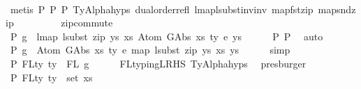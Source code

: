 \begin{isabellebody}
\ \ \ \ \isamarkupfalse%
\ {\isacharparenleft}{\kern0pt}metis\ P{}\ P{}\ P{}\ TyAlpha{\isachardot}{\kern0pt}hyps{\isacharparenleft}{\kern0pt}{}{\isacharparenright}{\kern0pt}\ dual{\isacharunderscore}{\kern0pt}order{\isachardot}{\kern0pt}refl\ lmap{\isacharunderscore}{\kern0pt}lsubst{\isacharunderscore}{\kern0pt}inv{\isacharunderscore}{\kern0pt}inv\ map{\isacharunderscore}{\kern0pt}fst{\isacharunderscore}{\kern0pt}zip\ map{\isacharunderscore}{\kern0pt}snd{\isacharunderscore}{\kern0pt}zip\isanewline
\ \ \ \ \ \ \ \ \ zip{\isacharunderscore}{\kern0pt}commute{\isacharparenright}{\kern0pt}\isanewline
\ \ \isamarkupfalse%
\ P{}{\isacharcolon}{\kern0pt}\ {\isachardoublequoteopen}g\ {\isasymsimeq}\ lmap\ {\isacharparenleft}{\kern0pt}lsubst\ {\isacharparenleft}{\kern0pt}zip\ ys{\isacharprime}{\kern0pt}\ xs{\isacharprime}{\kern0pt}{\isacharparenright}{\kern0pt}{\isacharparenright}{\kern0pt}\ {\isacharparenleft}{\kern0pt}Atom\ {\isacharparenleft}{\kern0pt}GAbs\ xs\ ty{}\ e{\isacharparenright}{\kern0pt}\ ys{\isacharparenright}{\kern0pt}{\isachardoublequoteclose}\isanewline
\ \ \ \ \isamarkupfalse%
\ P{}\ P{}\ \isamarkupfalse%
\ auto\isanewline
\ \ \isamarkupfalse%
\ \isamarkupfalse%
\ P{}{\isacharcolon}{\kern0pt}\ {\isachardoublequoteopen}g\ {\isasymsimeq}\ Atom\ {\isacharparenleft}{\kern0pt}GAbs\ xs\ ty{}\ e{\isacharparenright}{\kern0pt}\ {\isacharparenleft}{\kern0pt}map\ {\isacharparenleft}{\kern0pt}lsubst\ {\isacharparenleft}{\kern0pt}zip\ ys{\isacharprime}{\kern0pt}\ xs{\isacharprime}{\kern0pt}{\isacharparenright}{\kern0pt}{\isacharparenright}{\kern0pt}\ ys{\isacharparenright}{\kern0pt}{\isachardoublequoteclose}\isanewline
\ \ \ \ \isamarkupfalse%
\ simp\isanewline
\isanewline
\isanewline
\ \ \isamarkupfalse%
\ P{}{}{\isacharcolon}{\kern0pt}\ {\isachardoublequoteopen}FLty\ ty{\isacharprime}{\kern0pt}\ {\isacharequal}{\kern0pt}\ FL\ g{\isachardoublequoteclose}\isanewline
\ \ \ \ \isamarkupfalse%
\ FL{\isacharunderscore}{\kern0pt}typing{\isacharunderscore}{\kern0pt}LRHS\ TyAlpha{\isachardot}{\kern0pt}hyps{\isacharparenleft}{\kern0pt}{}{\isacharparenright}{\kern0pt}\ \isamarkupfalse%
\ presburger\isanewline
\ \ \isamarkupfalse%
\ \isamarkupfalse%
\ P{}{}{\isacharcolon}{\kern0pt}\ {\isachardoublequoteopen}FLty\ ty{\isacharprime}{\kern0pt}\ {\isasymsubseteq}\ set\ xs{\isacharprime}{\kern0pt}{\isachardoublequoteclose}\isanewline

\end{isabellebody}
